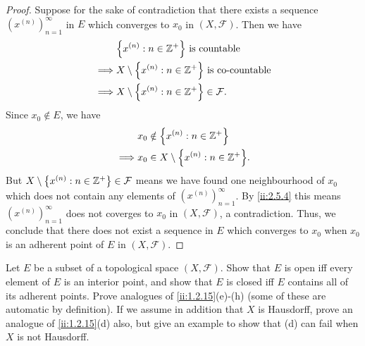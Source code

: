 \begin{proof}
  Suppose for the sake of contradiction that there exists a sequence \((x^{(n)})_{n = 1}^\infty\) in \(E\) which converges to \(x_0\) in \((X, \mathcal{F})\).
  Then we have
  \begin{align*}
             & \set{x^{(n)} : n \in \Z^+} \text{ is countable}                \\
    \implies & X \setminus \set{x^{(n)} : n \in \Z^+} \text{ is co-countable} \\
    \implies & X \setminus \set{x^{(n)} : n \in \Z^+} \in \mathcal{F}.
  \end{align*}
  Since \(x_0 \notin E\), we have
  \begin{align*}
             & x_0 \notin \set{x^{(n)} : n \in \Z^+}           \\
    \implies & x_0 \in X \setminus \set{x^{(n)} : n \in \Z^+}.
  \end{align*}
  But \(X \setminus \left\lbrace x^{(n)} : n \in \mathbb{Z}^+\right\rbrace \in \mathcal{F}\) means we have found one neighbourhood of \(x_0\) which does not contain any elements of \((x^{(n)})_{n = 1}^\infty\).
  By \cref{ii:2.5.4} this means \((x^{(n)})_{n = 1}^\infty\) does not coverges to \(x_0\) in \((X, \mathcal{F})\), a contradiction.
  Thus, we conclude that there does not exist a sequence in \(E\) which converges to \(x_0\) when \(x_0\) is an adherent point of \(E\) in \((X, \mathcal{F})\).
\end{proof}

\begin{ex}\label{ii:ex:2.5.11}
  Let \(E\) be a subset of a topological space \((X, \mathcal{F})\).
  Show that \(E\) is open iff every element of \(E\) is an interior point, and show that \(E\) is closed iff \(E\) contains all of its adherent points.
  Prove analogues of \cref{ii:1.2.15}(e)-(h) (some of these are automatic by definition).
  If we assume in addition that \(X\) is Hausdorff, prove an analogue of \cref{ii:1.2.15}(d) also, but give an example to show that (d) can fail when \(X\) is not Hausdorff.
\end{ex}


